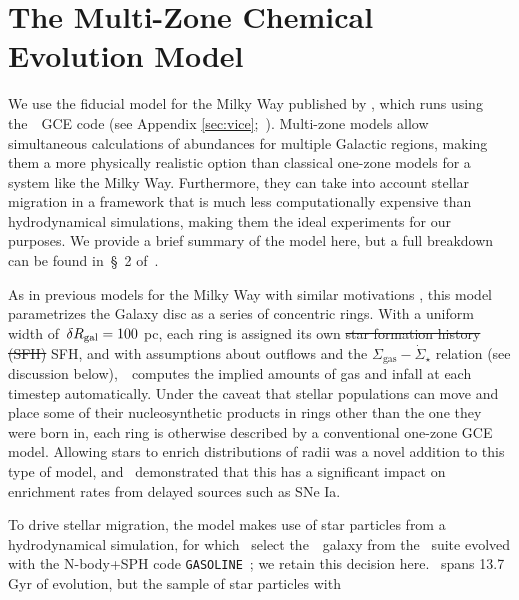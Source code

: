 \documentclass[ms.tex]{subfiles}
\begin{document}
\section{The Multi-Zone Chemical Evolution Model}
\label{sec:multizone}

We use the fiducial model for the Milky Way published by
\citet{Johnson2021}, which runs using the~\vice~GCE code (see Appendix
\ref{sec:vice};~\citealp{Johnson2020, Griffith2021}).
Multi-zone models allow simultaneous calculations of abundances for multiple
Galactic regions, making them a more physically realistic option than classical
one-zone models for a system like the Milky Way.
Furthermore, they can take into account stellar migration in a framework that
is much less computationally expensive than hydrodynamical simulations, making
them the ideal experiments for our purposes.
We provide a brief summary of the model here, but a full breakdown can be found
in~\S~2 of~\citet{Johnson2021}.
\par
As in previous models for the Milky Way with similar motivations
\citep[e.g.][]{Matteucci1989, Schoenrich2009, Minchev2013, Minchev2014,
Minchev2017, Sharma2021}, this model parametrizes the Galaxy disc as a series
of concentric rings.
With a uniform width of~$\delta R_\text{gal} = 100$ pc, each ring is assigned its own
{\color{red} \sout{star formation history (SFH)} SFH}, and with assumptions
about outflows and the
$\Sigma_\text{gas}-\dot{\Sigma}_\star$ relation (see discussion
below),~\vice~computes the implied amounts of gas and infall at each timestep
automatically.
Under the caveat that stellar populations can move and place some of their
nucleosynthetic products in rings other than the one they were born in, each
ring is otherwise described by a conventional one-zone GCE model.
Allowing stars to enrich distributions of radii was a novel addition to this
type of model, and~\citet{Johnson2021} demonstrated that this has a
significant impact on enrichment rates from delayed sources such as SNe Ia.
\par
To drive stellar migration, the model makes use of star particles from a
hydrodynamical simulation, for which~\citet{Johnson2021} select the~\hsim~galaxy
from the~\citet{Christensen2012} suite evolved with the N-body+SPH code
\texttt{GASOLINE}~\citep{Wadsley2004}; we retain this decision here.
\hsim~spans 13.7 Gyr of evolution, but the sample of star particles with
\end{document}
